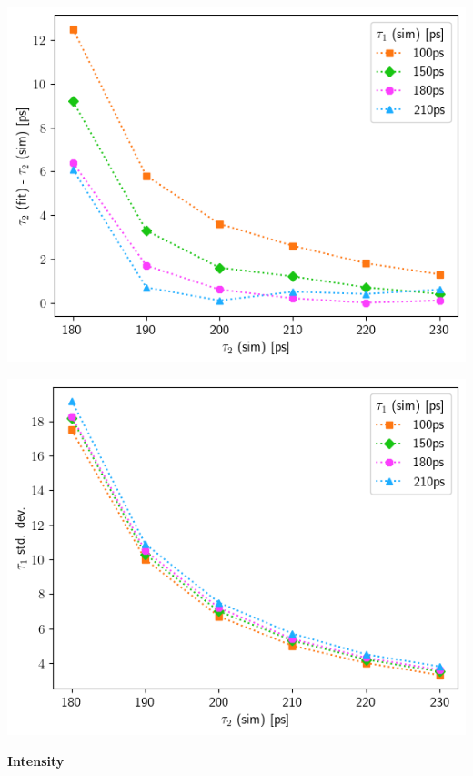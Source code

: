 {\begin{minipage}{ .47\linewidth}
    \includegraphics[width=\linewidth]{Batch 3/single Gaussian IRF/t2-diff 8020.png}
    \label{fig:compirf-t2-8020}
\end{minipage}
\hfill
\begin{minipage}{ .47\linewidth}
    \includegraphics[width=\linewidth]{Batch 3/single Gaussian IRF/t2-err 8020.png}
    \label{fig:compirf-t2err-8020}
\end{minipage}

\pagebreak
\textbf{Intensity}

}
